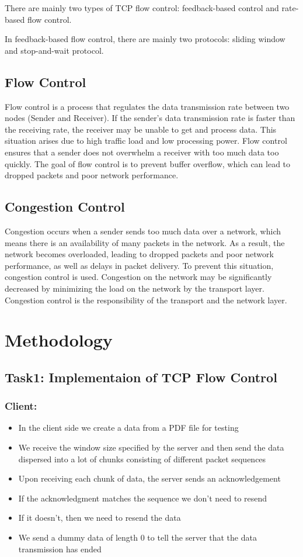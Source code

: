 \documentclass[11pt]{article}
\begin{document}
There are mainly two types of TCP flow control: feedback-based control and rate-based flow control.

In feedback-based flow control, there are mainly two protocols: sliding window and stop-and-wait protocol.
\subsection{Flow Control}
Flow control is a process that regulates the data transmission rate between two nodes (Sender and Receiver). If the sender's data transmission rate is faster than the receiving rate, the receiver may be unable to get and process data. This situation arises due to high traffic load and low processing power. Flow control ensures that a sender does not overwhelm a receiver with too much data too quickly. The goal of flow control is to prevent buffer overflow, which can lead to dropped packets and poor network performance.

\subsection{Congestion Control}
Congestion occurs when a sender sends too much data over a network, which means there is an availability of many packets in the network. As a result, the network becomes overloaded, leading to dropped packets and poor network performance, as well as delays in packet delivery. To prevent this situation, congestion control is used. Congestion on the network may be significantly decreased by minimizing the load on the network by the transport layer. Congestion control is the responsibility of the transport and the network layer.

\section{Methodology}
\subsection{Task1: Implementaion of TCP Flow Control}
    \subsubsection{Client:}
        \begin{itemize}
            \item In the client side we create a data from a PDF file for testing
            \item We receive the window size specified by the server and then send the data dispersed into a lot of chunks consisting of different packet sequences
            \item Upon receiving each chunk of data, the server sends an acknowledgement 
            \item If the acknowledgment matches the sequence we don't need to resend
            \item If it doesn't, then we need to resend the data
            \item We send a dummy data of length 0 to tell the server that the data transmission has ended
        \end{itemize}
\end{document}
